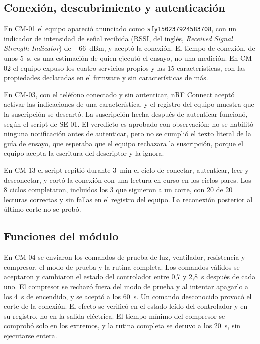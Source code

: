 \subsection{Conexión, descubrimiento y autenticación}
\label{subsec:ensayos_conexion}

En CM-01 el equipo apareció anunciado como \texttt{sfy150237924583708}, con un indicador de intensidad de señal recibida (RSSI, del inglés, \textit{Received Signal Strength Indicator}) de $-$66~dBm, y aceptó la conexión. El tiempo de conexión, de unos 5~s, es una estimación de quien ejecutó el ensayo, no una medición. En CM-02 el equipo expuso los cuatro servicios propios y las 15 características, con las propiedades declaradas en el firmware y sin características de más.

En CM-03, con el teléfono conectado y sin autenticar, nRF Connect aceptó activar las indicaciones de una característica, y el registro del equipo muestra que la suscripción se descartó. La suscripción hecha después de autenticar funcionó, según el script de SE-01. El veredicto es aprobado con observación: no se habilitó ninguna notificación antes de autenticar, pero no se cumplió el texto literal de la guía de ensayo, que esperaba que el equipo rechazara la suscripción, porque el equipo acepta la escritura del descriptor y la ignora.

En CM-13 el script repitió durante 3~min el ciclo de conectar, autenticar, leer y desconectar, y cortó la conexión con una lectura en curso en los ciclos pares. Los 8 ciclos completaron, incluidos los 3 que siguieron a un corte, con 20 de 20 lecturas correctas y sin fallas en el registro del equipo. La reconexión posterior al último corte no se probó.

\subsection{Funciones del módulo}
\label{subsec:ensayos_funciones}

En CM-04 se enviaron los comandos de prueba de luz, ventilador, resistencia y compresor, el modo de prueba y la rutina completa. Los comandos válidos se aceptaron y cambiaron el estado del controlador entre 0,7 y 2,8~s después de cada uno. El compresor se rechazó fuera del modo de prueba y al intentar apagarlo a los 4~s de encendido, y se aceptó a los 60~s. Un comando desconocido provocó el corte de la conexión. El efecto se verificó en el estado leído del controlador y en su registro, no en la salida eléctrica. El tiempo mínimo del compresor se comprobó solo en los extremos, y la rutina completa se detuvo a los 20~s, sin ejecutarse entera.

